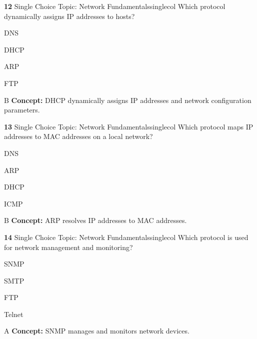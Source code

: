 \documentclass[10pt,a4paper]{article}
\begin{document}
\begin{qcard}{\color{white}\textbf{12} \hfill \small Single Choice \textbar{} Topic: Network Fundamentals}{singlecol}
Which protocol dynamically assigns IP addresses to hosts?

\begin{qoptions}
\item DNS
\item DHCP
\item ARP
\item FTP
\end{qoptions}
\begin{explainbox}{B}
\textbf{Concept:} DHCP dynamically assigns IP addresses and network configuration parameters.
\end{explainbox}
\end{qcard}

\begin{qcard}{\color{white}\textbf{13} \hfill \small Single Choice \textbar{} Topic: Network Fundamentals}{singlecol}
Which protocol maps IP addresses to MAC addresses on a local network?

\begin{qoptions}
\item DNS
\item ARP
\item DHCP
\item ICMP
\end{qoptions}
\begin{explainbox}{B}
\textbf{Concept:} ARP resolves IP addresses to MAC addresses.
\end{explainbox}
\end{qcard}

\begin{qcard}{\color{white}\textbf{14} \hfill \small Single Choice \textbar{} Topic: Network Fundamentals}{singlecol}
Which protocol is used for network management and monitoring?

\begin{qoptions}
\item SNMP
\item SMTP
\item FTP
\item Telnet
\end{qoptions}
\begin{explainbox}{A}
\textbf{Concept:} SNMP manages and monitors network devices.
\end{explainbox}
\end{qcard}
\end{document}
